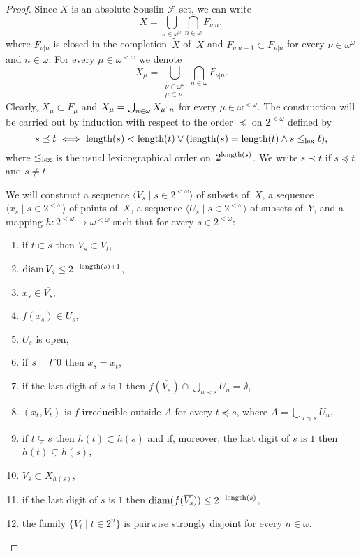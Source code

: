 \documentclass{raex}
\theoremstyle{plain}
\theoremstyle{definition}
\theoremstyle{remark}
\def\F{\mathcal{F}}
\def\conc{\hat{\hbox to .4em{}}}
\def\l{\textnormal{length}}
\def\diam{\operatorname{diam}}
\begin{document}
\begin{proof}
Since $X$ is an absolute Souslin-$\F$ set, we can write 
\[X = \bigcup_{\nu\in\omega^\omega}\bigcap_{n\in\omega}F_{\nu|n},\]
where $F_{\nu|n}$ is closed in the completion~$\widetilde{X}$ of~$X$ and $F_{\nu|n+1}\subset F_{\nu|n}$ for every $\nu\in\omega^\omega$ and $n\in\omega$. For every $\mu\in\omega^{<\omega}$ we denote
\[X_\mu = \bigcup_{\substack{\nu\in\omega^\omega\\\mu\subset\nu}}\bigcap_{n\in\omega}F_{\nu|n}.\]
Clearly, $X_\mu\subset F_\mu$ and $X_\mu=\bigcup_{n\in\omega}X_{\mu\conc n}$ for every $\mu\in\omega^{<\omega}$. The construction will be carried out by induction with respect to the order $\preceq$ on $2^{<\omega}$ defined by
\[s\preceq t \ \Longleftrightarrow\ \l(s)<\l(t) \vee (\l(s)=\l(t) \wedge s\le_{\textnormal{lex}}t),\]
where $\le_{\textnormal{lex}}$ is the usual lexicographical order on~$2^{\l(s)}$. We write $s\prec t$ if $s\preceq t$ and $s\neq t$.

We will construct a sequence $\langle V_s \mid s \in 2^{<\omega}\rangle$ of subsets of~$X$, a sequence $\langle x_s \mid s \in 2^{<\omega}\rangle$ of points of~$X$, a sequence $\langle U_s \mid s\in 2^{<\omega}\rangle$ of subsets of~$Y$, and a mapping $h \colon 2^{<\omega}\to \omega^{<\omega}$ such that for every $s\in 2^{<\omega}$:

\begin{enumerate}
\item
\label{c1}
if $t\subset s$ then $V_s\subset V_t$,
\item
\label{c2}
$\diam V_s\le 2^{-\l(s)+1}$,
\item
\label{c3}
$x_s\in\overline{V_s}$,
\item
\label{c4}
$f(x_s)\in U_s$,
\item
\label{c5}
$U_s$ is open,
\item
\label{c6}
if $s=t\conc 0$ then $x_s=x_t$,
\item
\label{c7}
if the last digit of $s$ is $1$ then $f(\overline{V_s})\cap\overline{\bigcup_{u\prec s}U_u}=\emptyset$,
\item
\label{c8}
$(x_t,V_t)$ is $f$-irreducible outside $A$ for every $t\preceq s$, where $A=\bigcup_{u\preceq s}U_u$,
\item
\label{c9}
if $t\subsetneq s$ then $h(t)\subset h(s)$ and if, moreover, the last digit of $s$ is $1$ then $h(t)\subsetneq h(s)$,
\item
\label{c10}
$V_s\subset X_{h(s)}$,
\item
\label{c11}
if the last digit of $s$ is $1$ then $\diam(f(\overline{V_s}))\le 2^{-\l(s)}$,
\item
\label{c12}
the family $\{V_t \mid t\in 2^n\}$ is pairwise strongly disjoint for every $n\in\omega$.
\end{enumerate}


\end{proof}
\end{document}
